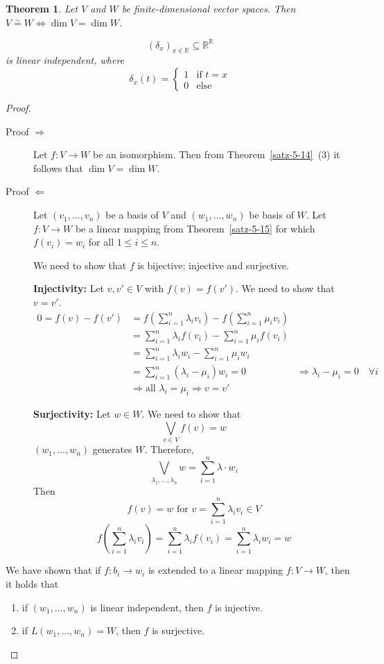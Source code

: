 \documentclass[a4paper,landscape,twocolumn]{article}
\newtheorem{theorem}{Theorem}
\begin{document}
\begin{theorem}
  \label{satz-5-16}
  Let $V$ and $W$ be finite-dimensional vector spaces.
  Then $V \stackrel\sim= W \Leftrightarrow \dim{V} = \dim{W}$.

  \[ \left(\delta_{x}\right)_{x \in \mathbb R} \subseteq \mathbb R^{\mathbb R} \]
  is linear independent, where
  \[
    \delta_x(t) = \begin{cases}
      1 & \text{if } t = x \\
      0 & \text{else}
    \end{cases}
  \]
\end{theorem}
\begin{proof}
  \begin{description}
    \item[Proof $\Rightarrow$]
      Let $f: V \rightarrow W$ be an isomorphism. Then from Theorem~\ref{satz-5-14}~(3)
      it follows that $\dim{V} = \dim{W}$.
    \item[Proof $\Leftarrow$]
      Let $(v_1, \dots, v_n)$ be a basis of $V$ and $(w_1, \dots, w_n)$ be basis of $W$.
      Let $f: V \rightarrow W$ be a linear mapping from Theorem~\ref{satz-5-15}
      for which $f(v_i) = w_i$ for all $1 \leq i \leq n$.

      We need to show that $f$ is bijective; injective and surjective.

      \textbf{Injectivity:} Let $v,v' \in V$ with $f(v) = f(v')$. We need to show that $v = v'$.
      \begin{align*}
        0 = f(v) - f(v')
          &= f\left(\sum_{i=1}^n \lambda_i v_i\right) - f\left(\sum_{i=1}^n \mu_i v_i\right) \\
          &= \sum_{i=1}^n \lambda_i f(v_i) - \sum_{i=1}^n \mu_i f(v_i) \\
          &= \sum_{i=1}^n \lambda_i w_i - \sum_{i=1}^n \mu_i w_i \\
          &= \sum_{i=1}^n (\lambda_i - \mu_i) w_i = 0
          &\Rightarrow \lambda_i - \mu_i = 0 \quad\forall i \\
          &\Rightarrow \text{all } \lambda_i = \mu_i \Rightarrow v = v'
      \end{align*}

      \textbf{Surjectivity:} Let $w \in W$. We need to show that
      \[ \bigvee_{v \in V} f(v) = w \]
      $(w_1, \dots, w_n)$ generates $W$. Therefore,
      \[ \bigvee_{\lambda_1, \dots, \lambda_n} w = \sum_{i=1}^n \lambda \cdot w_i \]
      Then
      \[ f(v) = w \text{ for } v = \sum_{i=1}^n \lambda_i v_i \in V \]
      \[ f\left(\sum_{i=1}^n \lambda_i v_i\right) = \sum_{i=1}^n \lambda_i f(v_i) = \sum_{i=1}^n \lambda_i w_i = w \]
  \end{description}

  We have shown that if $f: b_i \rightarrow w_i$ is extended to a linear mapping $f: V \rightarrow W$,
  then it holds that
  \begin{enumerate}
    \item if $(w_1, \dots, w_n)$ is linear independent, then $f$ is injective.
    \item if $L(w_1, \dots, w_n) = W$, then $f$ is surjective.
  \end{enumerate}
\end{proof}
\end{document}
